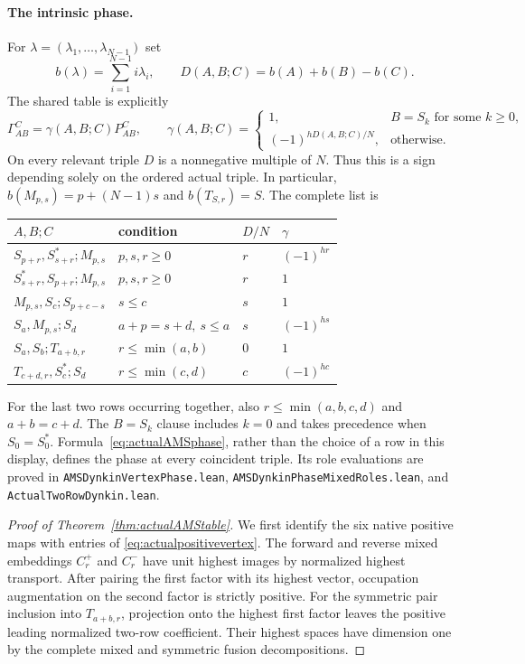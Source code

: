 \documentclass[10pt,a4paper]{article}
\newcommand{\lean}[1]{{\small\nolinkurl{#1}}}
\newenvironment{revision}{\begingroup}{\endgroup}
\begin{document}
\begin{revision}
\paragraph{The intrinsic phase.}
For $\lambda=(\lambda_1,\ldots,\lambda_{N-1})$ set
\[
 b(\lambda)=\sum_{i=1}^{N-1}i\lambda_i,\qquad
 D(A,B;C)=b(A)+b(B)-b(C).
\]
The shared table is explicitly
\begin{equation}\label{eq:actualAMSphase}
 \Gamma_{AB}^{C}=\gamma(A,B;C)P_{AB}^{C},\qquad
 \gamma(A,B;C)=
 \begin{cases}
  1,& B=S_k\text{ for some }k\ge0,\\
  (-1)^{hD(A,B;C)/N},&\text{otherwise}.
 \end{cases}
\end{equation}
On every relevant triple $D$ is a nonnegative multiple of $N$.
Thus this is a sign depending solely on the ordered actual triple.
In particular, $b(M_{p,s})=p+(N-1)s$ and $b(T_{S,r})=S$.
The complete list is
\begin{center}\small
\begin{tabular}{@{}llll@{}}
\toprule
$A,B;C$ & condition & $D/N$ & $\gamma$\\
\midrule
$S_{p+r},S_{s+r}^*;M_{p,s}$ & $p,s,r\ge0$ & $r$ & $(-1)^{hr}$\\
$S_{s+r}^*,S_{p+r};M_{p,s}$ & $p,s,r\ge0$ & $r$ & $1$\\
$M_{p,s},S_c;S_{p+c-s}$ & $s\le c$ & $s$ & $1$\\
$S_a,M_{p,s};S_d$ & $a+p=s+d,\ s\le a$ & $s$ & $(-1)^{hs}$\\
$S_a,S_b;T_{a+b,r}$ & $r\le\min(a,b)$ & $0$ & $1$\\
$T_{c+d,r},S_c^*;S_d$ & $r\le\min(c,d)$ & $c$ & $(-1)^{hc}$\\
\bottomrule
\end{tabular}
\end{center}
For the last two rows occurring together, also
$r\le\min(a,b,c,d)$ and $a+b=c+d$.
The $B=S_k$ clause includes $k=0$ and takes precedence when
$S_0=S_0^*$. Formula~\eqref{eq:actualAMSphase}, rather than the choice
of a row in this display, defines the phase at every coincident triple.
Its role evaluations are proved in
\lean{AMSDynkinVertexPhase.lean},
\lean{AMSDynkinPhaseMixedRoles.lean}, and
\lean{ActualTwoRowDynkin.lean}.

\begin{proof}[Proof of Theorem~\ref{thm:actualAMStable}]
We first identify the six native positive maps with entries of
\eqref{eq:actualpositivevertex}. The forward and reverse mixed embeddings
$C_r^+$ and $C_r^-$ have unit highest images by normalized highest
transport. After pairing the first factor with its highest vector,
occupation augmentation on the second factor is strictly positive. For the symmetric pair inclusion into $T_{a+b,r}$,
projection onto the highest first factor leaves the positive leading
normalized two-row coefficient. Their highest spaces have dimension
one by the complete mixed and symmetric fusion decompositions.


\end{proof}
\end{revision}
\end{document}
